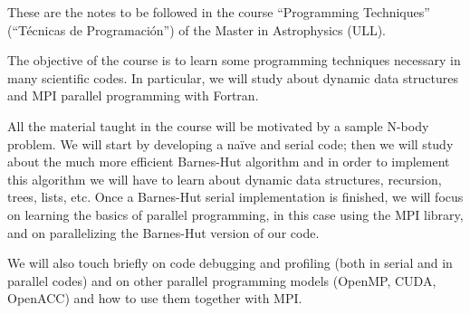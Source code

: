 These are the notes to be followed in the course ``Programming Techniques''
(``Técnicas de Programación'') of the Master in Astrophysics (ULL).

The objective of the course is to learn some programming techniques necessary in
many scientific codes. In particular, we will study about dynamic data
structures and MPI parallel programming with Fortran.

All the material taught in the course will be motivated by a sample N-body
problem. We will start by developing a naïve and serial code; then we will study
about the much more efficient Barnes-Hut algorithm and in order to implement
this algorithm we will have to learn about dynamic data structures, recursion,
trees, lists, etc. Once a Barnes-Hut serial implementation is finished, we will
focus on learning the basics of parallel programming, in this case using the MPI
library, and on parallelizing the Barnes-Hut version of our code.

We will also touch briefly on code debugging and profiling (both in serial and
in parallel codes) and on other parallel programming models (OpenMP, CUDA,
OpenACC) and how to use them together with MPI. 


